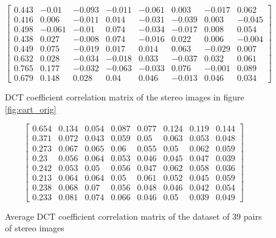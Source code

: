 \documentclass[10pt]{article}
\begin{document}
\begin{figure}
    \begin{equation*}
        \left[
        \begin{matrix}
        0.443 & -0.01  & -0.093 & -0.011 & -0.061 &   0.003 & -0.017 &  0.062 \\
        0.416 &  0.006 & -0.011 &  0.014 & -0.031 &  -0.039 &  0.003 & -0.045 \\
        0.498 & -0.061 & -0.01  &  0.074 & -0.034 &  -0.017 &  0.008 &  0.054 \\
        0.438 &  0.027 & -0.008 &  0.074 & -0.016 &   0.022 &  0.006 & -0.004 \\
        0.449 &  0.075 & -0.019 &  0.017 &  0.014 &   0.063 & -0.029 &  0.007 \\
        0.632 &  0.028 & -0.034 & -0.018 &  0.033 &  -0.037 &  0.032 &  0.061 \\
        0.765 &  0.177 & -0.032 & -0.063 & -0.033 &   0.076 & -0.001 &  0.089 \\
        0.679 &  0.148 &  0.028 &  0.04  &  0.046 &  -0.013 &  0.046 &  0.034
        \end{matrix}
        \right]
    \end{equation*}
    \caption{DCT coefficient correlation matrix of the stereo images in figure \ref{fig:cart_orig} }
\end{figure}

\begin{figure}
    \begin{equation*}
        \left[
        \begin{matrix}
        0.654 & 0.134 & 0.054 & 0.087 & 0.077 & 0.124 & 0.119 & 0.144 \\
        0.371 & 0.072 & 0.043 & 0.059 & 0.05  & 0.063 & 0.053 & 0.048 \\
        0.273 & 0.067 & 0.065 & 0.06  & 0.055 & 0.05  & 0.062 & 0.059 \\
        0.23  & 0.056 & 0.064 & 0.053 & 0.046 & 0.045 & 0.047 & 0.039 \\
        0.242 & 0.053 & 0.05  & 0.056 & 0.047 & 0.062 & 0.058 & 0.036 \\
        0.213 & 0.064 & 0.064 & 0.05  & 0.061 & 0.052 & 0.045 & 0.059 \\
        0.238 & 0.068 & 0.07  & 0.056 & 0.048 & 0.046 & 0.042 & 0.054 \\
        0.233 & 0.081 & 0.074 & 0.066 & 0.046 & 0.05  & 0.039 & 0.049
        \end{matrix}
        \right]
    \end{equation*}
    \caption{Average DCT coefficient correlation matrix of the dataset of 39 pairs of stereo images}
\end{figure}
\end{document}
